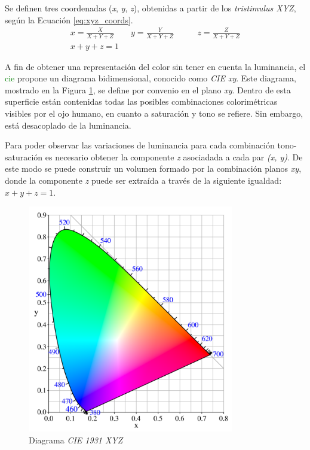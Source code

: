 \documentclass[a4paper, 12pt]{report}
\begin{document}
 Se definen tres coordenadas (\textit{x}, \textit{y}, \textit{z}), obtenidas a partir de los \textit{tristimulus XYZ}, según la Ecuación \ref{eq:xyz_coords}.
\footnotesize
\begin{equation}
    \begin{aligned}
        x = \frac{X}{X + Y + Z}\qquad y = \frac{Y}{X + Y  + Z}&\qquad z = \frac{Z}{X + Y + Z} \\
        x + y + z = 1 &
    \end{aligned}
    \label{eq:xyz_coords}
\end{equation}
\normalsize

 A fin de obtener una representación del color sin tener en cuenta la luminancia, el \textcolor{green}{cie} propone un diagrama bidimensional, conocido como \textit{CIE xy}. Este diagrama, mostrado en la Figura \ref{fig:CIExy1931}, se define por convenio en el plano \textit{xy}. Dentro de esta superficie están contenidas todas las posibles combinaciones colorimétricas visibles por el ojo humano, en cuanto a saturación y tono se refiere. Sin embargo, está desacoplado de la luminancia.
 
 Para poder observar las variaciones de luminancia para cada combinación tono-saturación es necesario obtener la componente \textit{z} asociadada a cada par \textit{(x, y)}. De este modo se puede construir un volumen formado por la combinación planos \textit{xy}, donde la componente \textit{z} puede ser extraída a través de la siguiente igualdad: $x + y + z = 1$.
 
 \begin{figure}[H]
    \centering
    \includegraphics[width=9cm, keepaspectratio]{img/3_Fundamentos_de_Television/3_1_Formatos_de_TV_Tradicionales/3_1_1_Colorimetria/3_CIExy1931.png}
    \caption{Diagrama \textit{CIE 1931 XYZ}}
    \label{fig:CIExy1931}
\end{figure}
\end{document}
